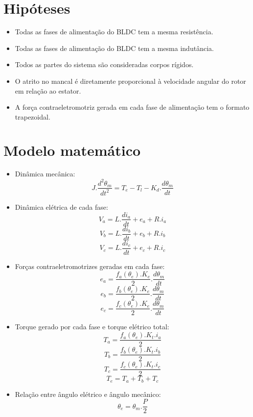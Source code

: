     \section{Hipóteses}
        \begin{itemize}
            \item Todas as fases de alimentação do BLDC tem a mesma resistência.
            \item Todas as fases de alimentação do BLDC tem a mesma indutância.
            \item Todos as partes do sistema são consideradas corpos rígidos.
            \item O atrito no mancal é diretamente proporcional à velocidade angular do rotor em relação ao estator.
            \item A força contraeletromotriz gerada em cada fase de alimentação tem o formato trapezoidal.
        \end{itemize}

    \section{Modelo matemático}
    \label{sec:modelo_matematico}
        \begin{itemize}
            \item Dinâmica mecânica: $$J.\frac{d^2\theta_m}{dt^2}=T_e-T_l-K_d.\frac{d\theta_m}{dt}$$
            \item Dinâmica elétrica de cada fase:
                $$V_a = L.\frac{di_a}{dt}+e_a+R.i_a$$
                $$V_b = L.\frac{di_b}{dt}+e_b+R.i_b$$
                $$V_c = L.\frac{di_c}{dt}+e_c+R.i_c$$
            \item Forças contraeletromotrizes geradas em cada fase:
                $$e_a = \frac{f_a(\theta_e).K_e}{2}.\frac{d\theta_m}{dt} $$
                $$e_b = \frac{f_b(\theta_e).K_e}{2}.\frac{d\theta_m}{dt} $$
                $$e_c = \frac{f_c(\theta_e).K_e}{2}.\frac{d\theta_m}{dt} $$
            \item Torque gerado por cada fase e torque elétrico total:
                $$T_a=\frac{f_a(\theta_e).K_t.i_a}{2}$$
                $$T_b=\frac{f_b(\theta_e).K_t.i_b}{2}$$
                $$T_c=\frac{f_c(\theta_e).K_t.i_c}{2}$$
                $$T_e=T_a+T_b+T_c$$
            \item Relação entre ângulo elétrico e ângulo mecânico:
                $$\theta_e=\theta_m.\frac{P}{2}$$
        \end{itemize}

